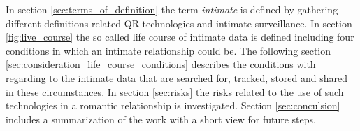 In section \ref{sec:terms_of_definition} the term \textit{intimate} is defined by gathering different definitions related \acl{QR}-technologies and intimate surveillance.
In section \ref{fig:live_course} the so called life course of intimate data is defined including four conditions in which an intimate relationship could be.
The following section \ref{sec:consideration_life_course_conditions} describes the conditions with regarding to the intimate data that are searched for, tracked, stored and shared in these circumstances.
In section \ref{sec:risks} the risks related to the use of such technologies in a romantic relationship is investigated.
Section \ref{sec:conculsion} includes a summarization of the work with a short view for future steps.

%
%
%

